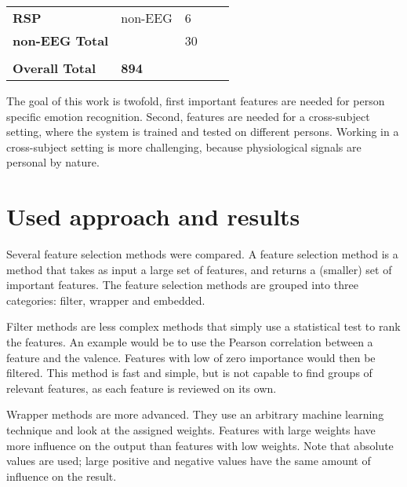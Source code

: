 \documentclass[11pt,journal,compsoc]{IEEEtran}
\newcommand{\npar}{\par \vspace{2.3ex plus 0.3ex minus 0.3ex}}
\begin{document}
\begin{table}[H]
\begin{tabular}{l|llll}
\textbf{RSP}            & non-EEG       & 6                             &                           &              \\
\textbf{non-EEG Total}  &               & 30                            &                           &              \\
                        &               &                               &                           &              \\ \hline
\textbf{Overall Total}  & \textbf{894}  &                               &                           &             
\end{tabular}
\end{table}

The goal of this work is twofold, first important features are needed for person specific emotion recognition. Second, features are needed for a cross-subject setting, where the system is trained and tested on different persons. Working in a cross-subject setting is more challenging, because physiological signals are personal by nature\citep{DEAP}.

\section{Used approach and results} \label{approach}

Several feature selection methods were compared. A feature selection method is a method that takes as input a large set of features, and returns a (smaller) set of important features. The feature selection methods are grouped into three categories: filter, wrapper and embedded.

\npar

Filter methods are less complex methods that simply use a statistical test to rank the features. An example would be to use the Pearson correlation between a feature and the valence. Features with low of zero importance would then be filtered. This method is fast and simple, but is not capable to find groups of relevant features, as each feature is reviewed on its own.

\npar

Wrapper methods are more advanced. They use an arbitrary machine learning technique and look at the assigned weights. Features with large weights have more influence on the output than features with low weights. Note that absolute values are used; large positive and negative values have the same amount of influence on the result. 

\npar
\end{document}

